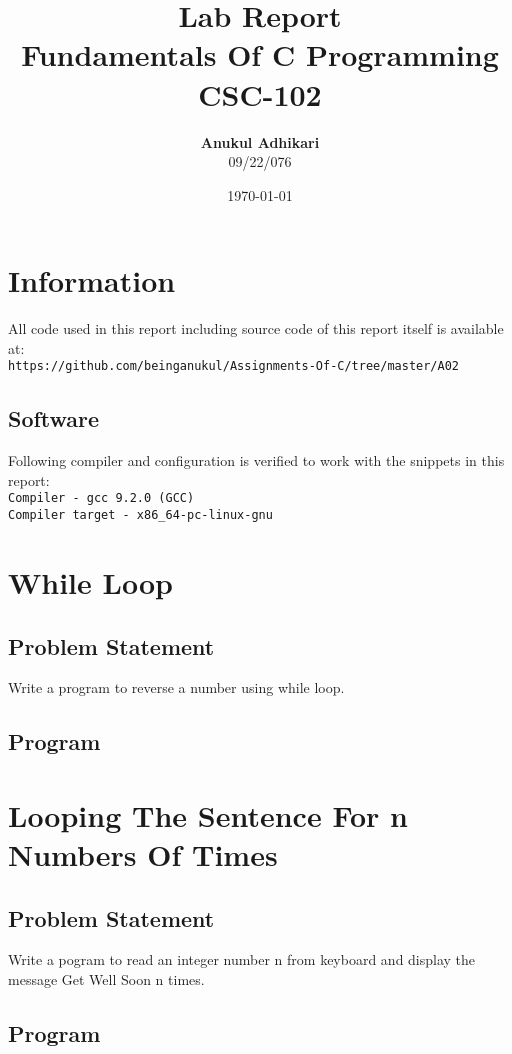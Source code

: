 \documentclass[11pt]{report}
\title{Lab Report \\
      \textbf{Fundamentals Of C Programming} \\
      CSC-102}
\author{\textbf{Anukul Adhikari} \\ 09/22/076}
\date{\today}
\begin{document}
\maketitle

\chapter*{Information}
All code used in this report including source code of this report itself is available at:\\ \texttt{https://github.com/beinganukul/Assignments-Of-C/tree/master/A02}
\section*{Software}
Following compiler and configuration is verified to work with the snippets in this report:\\
\texttt{Compiler - gcc 9.2.0 (GCC) 
\\
Compiler target - x86\_64-pc-linux-gnu
}

\tableofcontents

\chapter{While Loop}
\section{Problem Statement}
Write a program to reverse a number using while loop.
\section{Program}



\chapter{Looping The Sentence For n Numbers Of Times}
\section{Problem Statement}
Write a pogram to read an integer number n from keyboard and display the message Get Well Soon n times.

\section{Program}

\end{document}
